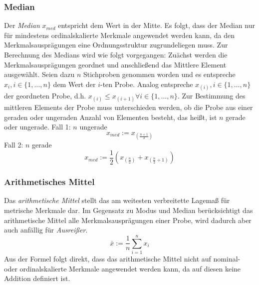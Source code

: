 \documentclass[fontsize=11pt]{scrartcl}
\begin{document}
                        \subsubsection{Median}
                        Der \emph{Median} $x_{med}$ entspricht dem Wert in der Mitte. Es folgt, dass der Median nur für mindestens ordinalskalierte Merkmale angewendet werden kann, da den Merkmalsausprägungen eine Ordnungsstruktur zugrundeliegen muss. \cite{kohn2005}
                        \newline
                        Zur Berechnung des Medians wird wie folgt vorgegangen: Zuächst werden die Merkmalsausprägungen geordnet und anschließend das Mittlere Element ausgewählt. Seien dazu $n$ Stichproben genommen worden und es entspreche $x_i,i \in \{1,\dots,n\}$ dem Wert der $i$-ten Probe. Analog entspreche $x_{(i)}, i \in \{1,\dots,n\}$ der geordneten Probe, d.h. $x_{(i)} \leq x_{(i+1)} \forall i \in \{1,\dots,n\}$.
                        \newline
                        Zur Bestimmung des mittleren Elements der Probe muss unterschieden werden, ob die Probe aus einer geraden oder ungeraden Anzahl von Elementen besteht, das heißt, ist $n$ gerade oder ungerade.
                        \newline
                        Fall 1:
                        \newline
                        $n$ ungerade
                        $$ x_{med} := x_{(\frac{n+1}{2})} $$
                        Fall 2:
                        \newline
                        $n$ gerade
                        $$ x_{med} := \frac{1}{2}\left( x_{(\frac{n}{2})} + x_{(\frac{n}{2}+1)} \right) $$
                    
                        \subsubsection{Arithmetisches Mittel}
                        Das \emph{arithmetische Mittel} stellt das am weitesten verbreitette Lagemaß für metrische Merkmale dar. Im Gegensatz zu Modus und Median berücksichtigt das arithmetische Mittel alle Merkmalsausprägungen einer Probe, wird dadurch aber auch anfällig für \emph{Ausreißer}.
                        $$ \bar{x} := \frac{1}{n}\sum_{i=1}^nx_i $$ 
                        Aus der Formel folgt direkt, dass das arithmetische Mittel nicht auf nominal- oder ordinalskalierte Merkmale angewendet werden kann, da auf diesen keine Addition definiert ist.
\end{document}
